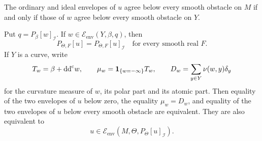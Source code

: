 \begin{corollary}\label{cor:fibration-obstacle-equality}\label{cor:zero-volume-product-obstacles}
The ordinary and ideal envelopes of $u$ agree below every smooth obstacle on $M$ if and only if those of $w$ agree below every smooth obstacle on $Y$.

Put $q=P_\beta[w]_{\mathcal I}$. If $w\in\mathcal E_{\mathrm{env}}(Y,\beta,q)$, then
\[
 P_{\Theta,F}[u]=P_{\Theta,F}[u]_{\mathcal I}
       \quad\text{for every smooth real }F.
\]
If $Y$ is a curve, write
\[
 T_w=\beta+\mathrm{dd}^{\mathrm{c}} w,\qquad
 \mu_w=\mathbf1_{\{w=-\infty\}}T_w,\qquad
 D_w=\sum_{y\in Y}\nu(w,y)\delta_y
\]
for the curvature measure of $w$, its polar part and its atomic part. Then equality of the two envelopes of $u$ below zero, the equality $\mu_w=D_w$, and equality of the two envelopes of $u$ below every smooth obstacle are equivalent.
They are also equivalent to
\[
 u\in\mathcal E_{\mathrm{env}}(M,\Theta,P_\Theta[u]_{\mathcal I}).
\]
\end{corollary}
